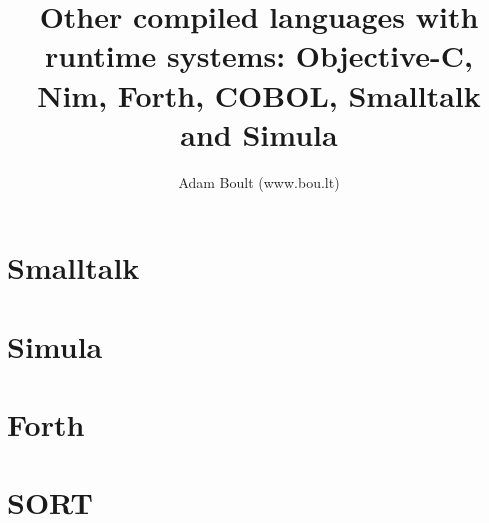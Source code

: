 \documentclass[oneside]{book}
\begin{document}
\author{Adam Boult (www.bou.lt)}
\title{Other compiled languages with runtime systems: Objective-C, Nim, Forth, COBOL, Smalltalk and Simula}
\maketitle

\setcounter{tocdepth}{0}
\tableofcontents



\part{Smalltalk}

\part{Simula}

\part{Forth}


\part{SORT}

\end{document}
